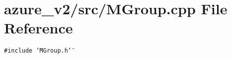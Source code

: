 \section{azure\_\-v2/src/MGroup.cpp File Reference}
\label{MGroup_8cpp}
{\tt \#include \char`\"{}MGroup.h\char`\"{}}\par
